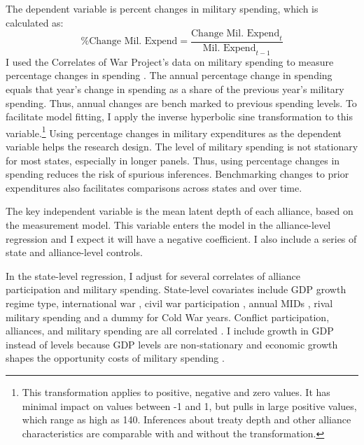 \documentclass[12pt]{article}
\begin{document}
The dependent variable is percent changes in military spending, which is calculated as:
\begin{equation}
\mbox{\% Change Mil. Expend} = \frac{ \mbox{Change Mil. Expend}_t }{ \mbox{Mil. Expend}_{t-1} }
\end{equation} 
I used the Correlates of War Project's data on military spending to measure percentage changes in spending \citep{SingerCINC1988}.
The annual percentage change in spending equals that year's change in spending as a share of the previous year's military spending.
Thus, annual changes are bench marked to previous spending levels. 
To facilitate model fitting, I apply the inverse hyperbolic sine transformation to this variable.\footnote{This transformation applies to positive, negative and zero values. It has minimal impact on values between -1 and 1, but pulls in large positive values, which range as high as 140. Inferences about treaty depth and other alliance characteristics are comparable with and without the transformation.}
Using percentage changes in military expenditures as the dependent variable helps the research design. 
The level of military spending is not stationary for most states, especially in longer panels. 
Thus, using percentage changes in spending reduces the risk of spurious inferences.
Benchmarking changes to prior expenditures also facilitates comparisons across states and over time. 


The key independent variable is the mean latent depth of each alliance, based on the measurement model. 
This variable enters the model in the alliance-level regression and I expect it will have a negative coefficient. 
I also include a series of state and alliance-level controls.


In the state-level regression, I adjust for several correlates of alliance participation and military spending. 
State-level covariates include GDP growth \citep{Boltetal2018} regime type, international war \citep{Reiteretal2016}, civil war participation \citep{SarkeesWayman2010}, annual MIDs \citep{Gibleretal2016}, rival military spending \citep{ThompsonDreyer2012} and a dummy for Cold War years.
Conflict participation, alliances, and military spending are all correlated \citep{SeneseVasquez2008}.
I include growth in GDP instead of levels because GDP levels are non-stationary and economic growth shapes the opportunity costs of military spending \citep{Kimball2010, Zielinskietal2017}.  
\end{document}
